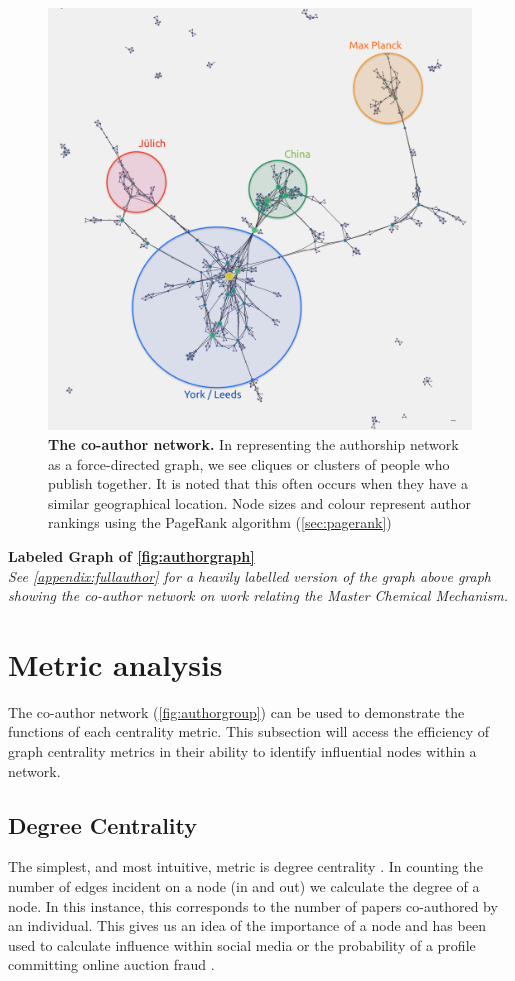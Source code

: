\begin{figure}[H]
     \centering
         \includegraphics[width=.8\textwidth]{figures_c3/GroupAuthor.png}
        \caption{ \textbf{The co-author network.} In representing the authorship network as a force-directed graph, we see cliques or clusters of people who publish together. It is noted that this often occurs when they have a similar geographical location. Node sizes and colour represent author rankings using the PageRank algorithm (\autoref{sec:pagerank})}
        \label{fig:authorgroup}
\end{figure}


\textbf{Labeled Graph of \autoref{fig:authorgraph}}\\
\textit{See \autoref{appendix:fullauthor} for a heavily labelled version of the graph above graph showing the co-author network on work relating the Master Chemical Mechanism. }


\section{Metric analysis}\label{sec:graphcentrality}

The co-author network (\autoref{fig:authorgroup}) can be used to demonstrate the functions of each centrality metric. This subsection will access the efficiency of graph centrality metrics in their ability to identify influential nodes within a network. 


\subsection{Degree Centrality}
The simplest, and most intuitive, metric is degree centrality \citep{degreefreeman}.  In counting the number of edges incident on a node (in and out) we calculate the degree of a node. In this instance, this corresponds to the number of papers co-authored by an individual. This gives us an idea of the importance of a node and has been used to calculate influence within social media or the probability of a profile committing online auction fraud \citep{degreetwitter,degreefreeman}.


